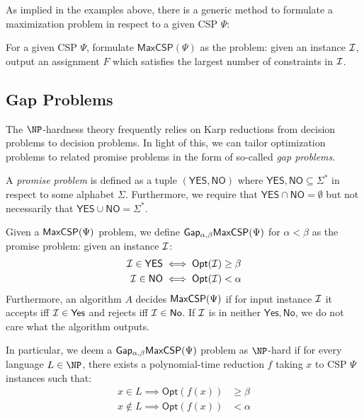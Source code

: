   As implied in the examples above, there is a generic method to formulate a maximization problem in respect to a given CSP $\Psi$:
  \begin{definition}
    For a given CSP $\Psi$, formulate $\mathsf{MaxCSP}(\Psi)$ as the problem: given an instance $\mathcal{I}$, output an assignment $F$ which satisfies the largest number of constraints in $\mathcal{I}$.
  \end{definition}

\subsection{Gap Problems}

The $\NP$-hardness theory frequently relies on Karp reductions from decision problems to decision problems. In light of this, we can tailor optimization problems to related promise problems in the form of so-called \emph{gap problems}.

\begin{definition} \label{promiseDef}
  A \emph{promise problem} is defined as a tuple $(\mathsf{YES}, \mathsf{NO})$ where $\mathsf{YES},\mathsf{NO} \subseteq \Sigma^*$ in respect to some alphabet $\Sigma$. Furthermore, we require that $\mathsf{YES} \cap \mathsf{NO} = \emptyset$ but not necessarily that $\mathsf{YES} \cup \mathsf{NO} = \Sigma^*$.
\end{definition}

\begin{definition} \label{gapDef}
  Given a $\mathsf{MaxCSP}(\Psi)$ problem, we define $\mathsf{Gap_{\alpha,\beta}}\mathsf{MaxCSP}(\Psi)$ for $\alpha < \beta$ as the promise problem: given an instance $\mathcal{I}$:
  \begin{align}
      \mathcal{I} \in \mathsf{YES} & \iff \mathsf{Opt}(\mathcal{I}) \geq \beta \\
        \mathcal{I} \in \mathsf{NO} & \iff \mathsf{Opt}(\mathcal{I}) < \alpha
  \end{align}
  Furthermore, an algorithm $A$ decides $\mathsf{MaxCSP}(\Psi)$ if for input instance $\mathcal{I}$ it accepts iff $\mathcal{I} \in \mathsf{Yes}$ and rejects iff $\mathcal{I} \in \mathsf{No}$. If $\mathcal{I}$ is in neither $\mathsf{Yes}, \mathsf{No}$, we do not care what the algorithm outputs.
\end{definition}

In particular, we deem a $\mathsf{Gap_{\alpha,\beta}}\mathsf{MaxCSP}(\Psi)$ problem as $\NP$-hard if for every language $L \in \NP$, there exists a polynomial-time reduction $f$ taking $x$ to CSP $\Psi$ instances such that:
\begin{align*}
  x \in L \implies \mathsf{Opt}(f(x)) & \geq \beta \\
  x \not\in L \implies \mathsf{Opt}(f(x))&  < \alpha
\end{align*}


